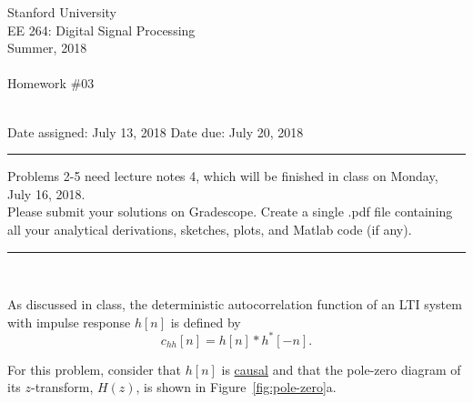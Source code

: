 \documentclass[12pt]{report}
\begin{document}
\thispagestyle{empty}
\begin{centering}
	{\large Stanford University}\\
	{\large EE 264: Digital Signal Processing}\\
	{\large Summer, 2018} \\
	\mbox{}\\
	{\large Homework \#03}\\
	\mbox{}\\
\end{centering}
\noindent Date assigned:  July 13, 2018 \hfill
Date due: July 20, 2018\\
\noindent \rule{6.5 in}{0.5pt}
  Problems 2-5 need lecture notes 4, which will be finished in class on Monday, July 16, 2018. \\
  Please submit your solutions on Gradescope. Create a single .pdf file containing all your analytical derivations, sketches, plots, and Matlab code (if any). \\
\noindent
\rule{6.5 in}{0.5pt}
\mbox{}\\




As discussed in class, the deterministic autocorrelation function of an LTI system with impulse response $h[n]$ is defined by
\begin{equation}
c_{hh}[n] = h[n] \ast h^*[-n].
\end{equation}

For this problem, consider that $h[n]$ is \underline{causal} and that the pole-zero diagram of its $z$-transform, $H(z)$, is shown in Figure~\ref{fig:pole-zero}a.
\end{document}

